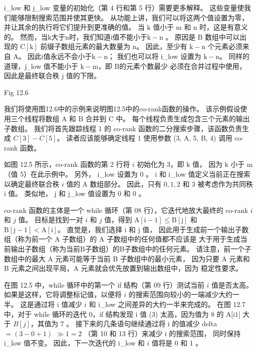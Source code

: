 i\_low 和 j\_low 变量的初始化（第 4 行和第 5 行）需要更多解释。 
这些变量使我们能够限制搜索范围并使其更快。 从功能上讲，我们可以将这两个值设置为零，并让其余的执行将它们提升到更准确的值。 
当 $\mathrm{k}$ 值小于 $\mathrm{m}$ 和 $\mathrm{n}$ 时，这是有意义的。 
然而，当$\mathrm{k}$大于$\mathrm{n}$时，我们知道$\mathrm{i}$值不能小于$\mathrm{k}-\mathrm{n}$ 。 
原因是 B 数组中可以出现的 $\mathrm{C}[\mathrm{k}]$ 前缀子数组元素的最大数量为 $\mathrm{n}$。 
因此，至少有 $\mathrm{k}-\mathrm{n}$ 个元素必须来自 $\mathrm{A}$。 
因此$\mathrm{i}$值永远不会小于$\mathrm{k}-\mathrm{n}$； 
我们也可以将 i\_low 设置为 $\mathrm{k}-\mathrm{n}$。 
同样的道理，$\mathrm{j}_{-}$low 值不能小于 $\mathrm{k}-\mathrm{m}$，即 $\mathrm{B 的元素个数最少 }$ 必须在合并过程中使用，因此是最终联合秩 $\mathrm{j}$ 值的下限。

{\color{red} Fig 12.6}

我们将使用图12.6中的示例来说明图12.5中的co-rank函数的操作。 
该示例假设使用三个线程将数组 $\mathrm{A}$ 和 $\mathrm{B}$ 合并到 $\mathrm{C}$ 中。 
每个线程负责生成包含三个元素的输出子数组。 
我们将首先跟踪线程 1 的 co-rank 函数的二分搜索步骤，该函数负责生成 $C[3]-C[5]$。 
读者应该能够确定线程 1 使用参数 (3, A, 5, B, 4) 调用 co-rank 函数。

如图 12.5 所示，co-rank 函数的第 2 行将 $i$ 初始化为 3，即 $\mathrm{k}$ 值，
因为 $\mathrm{k}$ 小于 $\mathrm{ m}$（值 5）在此示例中。 另外， i\_low 设置为 0 。 
$\mathrm{i}$ 和 i\_low 值定义当前正在搜索以确定最终联合秩 $i$ 值的 A 数组部分。 
因此，只有 $0,1,2$ 和 3 被考虑作为共同秩 i 值。 类似地， $\mathrm{j}$ 和 j\_low 值设置为 0 和 0 。

co-rank 函数的主体是一个 while 循环（第 08 行），它迭代地放大最终的 co-rank $i$ 和 $j$ 值。 
目标是找到一对 $i$ 和 $j$ 值，得到 $\mathrm{A}[\mathrm{i}-1] \leq \mathrm{B}[\mathrm{j}]$ 
和 $\mathrm{B}[\mathrm{j}-1]<\mathrm{A}[\mathrm{i}]$。 
直觉是，我们选择 $\mathrm{i}$ 和 $\mathrm{j}$ 值，
因此用于生成前一个输出子数组（称为前一个 A 子数组）的 A 子数组中的任何值都不应该是 大于用于生成当前输出子数组（称为当前B子数组）的B子数组中的任何元素。 
请注意，前一个子数组中的最大 A 元素可能等于当前 B 子数组中的最小元素，
因为只要 A 元素和 B 元素之间出现平局，A 元素就会优先放置到输出数组中，因为 稳定性要求。

在图 12.5 中，while 循环中的第一个 if 结构（第 09 行）测试当前 $i$ 值是否太高。 
如果是这样，它将调整标记值，以便将 $i$ 的搜索范围向较小的一端减少大约一半。 
这是通过将 i 值减少 $i$ 和 i\_low 之间差异的大约一半来完成的。 
在图 12.7 中，对于 while 循环的迭代 0，if 结构发现 i 值 (3) 太高，因为值为 8 的 A[i$1]$ 大于 $B[j ]$，其值为 7 。 
接下来的几条语句继续通过将 i 的值减少 delta $=(3-0+1)$ $\gg 1=2$ （第 10 和 13 行）来减少 i 的搜索范围，
同时保持 i\_low 值不变。 因此，下一次迭代的 i\_low 和 $i$ 值将是 0 和 1 。

